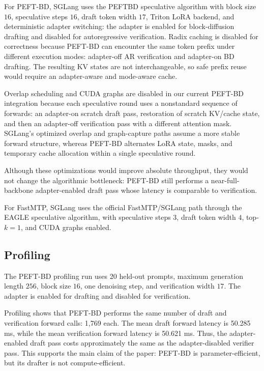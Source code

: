 \documentclass[11pt]{article}
\begin{document}
For PEFT-BD, SGLang uses the PEFTBD speculative algorithm with block size $16$, speculative steps $16$, draft token width $17$, Triton LoRA backend, and deterministic adapter switching: the adapter is enabled for block-diffusion drafting and disabled for autoregressive verification. Radix caching is disabled for correctness because PEFT-BD can encounter the same token prefix under different execution modes: adapter-off AR verification and adapter-on BD drafting. The resulting KV states are not interchangeable, so safe prefix reuse would require an adapter-aware and mode-aware cache.

Overlap scheduling and CUDA graphs are disabled in our current PEFT-BD integration because each speculative round uses a nonstandard sequence of forwards: an adapter-on scratch draft pass, restoration of scratch KV/cache state, and then an adapter-off verification pass with a different attention mask. SGLang's optimized overlap and graph-capture paths assume a more stable forward structure, whereas PEFT-BD alternates LoRA state, masks, and temporary cache allocation within a single speculative round.

Although these optimizations would improve absolute throughput, they would not change the algorithmic bottleneck: PEFT-BD still performs a near-full-backbone adapter-enabled draft pass whose latency is comparable to verification.

For FastMTP, SGLang uses the official FastMTP/SGLang path through the EAGLE speculative algorithm, with speculative steps $3$, draft token width $4$, top-$k=1$, and CUDA graphs enabled.

\subsection{Profiling}

The PEFT-BD profiling run uses 20 held-out prompts, maximum generation length $256$, block size $16$, one denoising step, and verification width $17$. The adapter is enabled for drafting and disabled for verification.

Profiling shows that PEFT-BD performs the same number of draft and verification forward calls: 1,769 each. The mean draft forward latency is 50.285 ms, while the mean verification forward latency is 50.621 ms. Thus, the adapter-enabled draft pass costs approximately the same as the adapter-disabled verifier pass. This supports the main claim of the paper: PEFT-BD is parameter-efficient, but its drafter is not compute-efficient.
\end{document}
